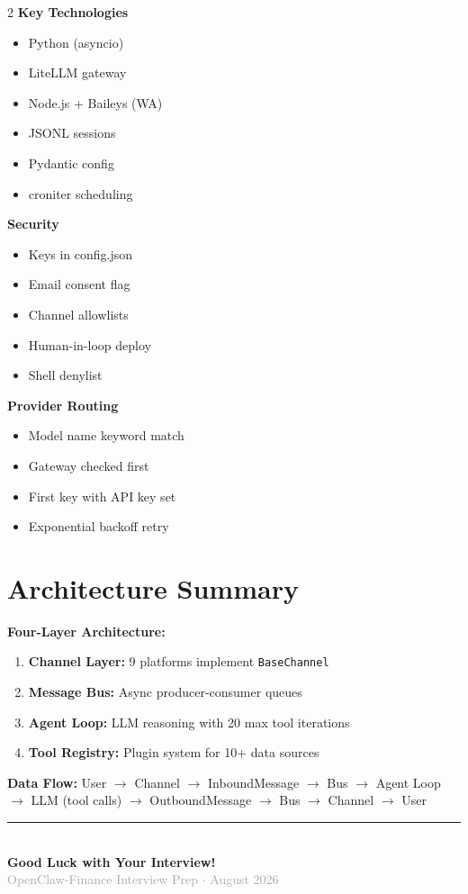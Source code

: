 \documentclass[11pt,a4paper]{article}
\begin{document}
\begin{multicols}{2}
\textbf{Key Technologies}
\begin{itemize}[nosep,leftmargin=*]
\item Python (asyncio)
\item LiteLLM gateway
\item Node.js + Baileys (WA)
\item JSONL sessions
\item Pydantic config
\item croniter scheduling
\end{itemize}

\textbf{Security}
\begin{itemize}[nosep,leftmargin=*]
\item Keys in config.json
\item Email consent flag
\item Channel allowlists
\item Human-in-loop deploy
\item Shell denylist
\end{itemize}

\textbf{Provider Routing}
\begin{itemize}[nosep,leftmargin=*]
\item Model name keyword match
\item Gateway checked first
\item First key with API key set
\item Exponential backoff retry
\end{itemize}
\end{multicols}

\section{Architecture Summary}

\textbf{Four-Layer Architecture:}
\begin{enumerate}[nosep,leftmargin=*]
\item \textbf{Channel Layer:} 9 platforms implement \texttt{BaseChannel}
\item \textbf{Message Bus:} Async producer-consumer queues
\item \textbf{Agent Loop:} LLM reasoning with 20 max tool iterations
\item \textbf{Tool Registry:} Plugin system for 10+ data sources
\end{enumerate}

\textbf{Data Flow:} User $\rightarrow$ Channel $\rightarrow$ InboundMessage $\rightarrow$ Bus $\rightarrow$ Agent Loop $\rightarrow$ LLM (tool calls) $\rightarrow$ OutboundMessage $\rightarrow$ Bus $\rightarrow$ Channel $\rightarrow$ User

\vfill
\begin{center}
\rule{0.5\textwidth}{0.5pt}\\[0.5cm]
{\large\textcolor{primaryblue}{\textbf{Good Luck with Your Interview!}}}\\[0.3cm]
{\small\textcolor{darkgray}{OpenClaw-Finance Interview Prep $\cdot$ August 2026}}
\end{center}
\end{document}
